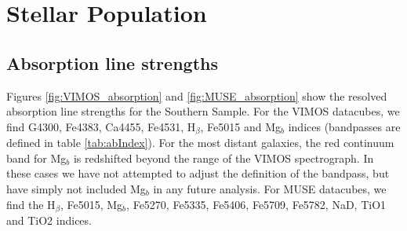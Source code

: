 		


 


\section{Stellar Population}
	\label{sec:pop}

	\subsection{Absorption line strengths}
		\label{subsec:absorption}
		Figures \ref{fig:VIMOS_absorption} and \ref{fig:MUSE_absorption} show the resolved absorption line strengths for the Southern Sample. For the VIMOS datacubes, we find G4300, Fe4383, Ca4455, Fe4531, H$_\beta$, Fe5015 and Mg$_b$ indices (bandpasses are defined in table \ref{tab:abIndex}). For the most distant galaxies, the red continuum band for Mg$_b$ is redshifted beyond the range of the VIMOS spectrograph. In these cases we have not attempted to adjust the definition of the bandpass, but have simply not included Mg$_b$ in any future analysis. For MUSE datacubes, we find the H$_\beta$, Fe5015, Mg$_b$, Fe5270, Fe5335, Fe5406, Fe5709, Fe5782, NaD, TiO1 and TiO2 indices. 

